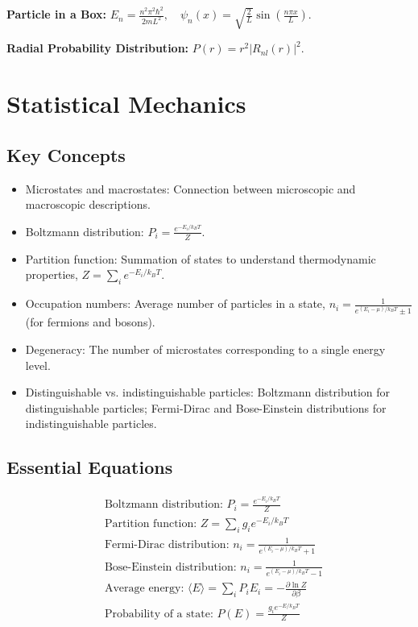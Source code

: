 \documentclass{article}
\newcommand{\eqbox}[1]{\begin{tcolorbox}[colback=gray!10] #1 \end{tcolorbox}}
\newcommand{\conceptbox}[1]{\begin{tcolorbox}[colback=blue!10] #1 \end{tcolorbox}}
\begin{document}
\eqbox{
\textbf{Particle in a Box:} \( E_n = \displaystyle\frac{n^2\pi^2\hbar^2}{2mL^2}, \quad \psi_n(x) = \sqrt{\frac{2}{L}} \sin\left(\frac{n\pi x}{L}\right) \).
}

\eqbox{
\textbf{Radial Probability Distribution:} \( P(r) = r^2|R_{nl}(r)|^2 \).
}

\section{Statistical Mechanics}

\subsection{Key Concepts}
\conceptbox{
\begin{itemize}
    \item Microstates and macrostates: Connection between microscopic and macroscopic descriptions.
    \item Boltzmann distribution: $P_i = \frac{e^{-E_i/k_BT}}{Z}$.
    \item Partition function: Summation of states to understand thermodynamic properties, $Z = \sum_i e^{-E_i/k_BT}$.
    \item Occupation numbers: Average number of particles in a state, $n_i = \frac{1}{e^{(E_i-\mu)/k_BT} \pm 1}$ (for fermions and bosons).
    \item Degeneracy: The number of microstates corresponding to a single energy level.
    \item Distinguishable vs. indistinguishable particles: Boltzmann distribution for distinguishable particles; Fermi-Dirac and Bose-Einstein distributions for indistinguishable particles.
\end{itemize}
}

\subsection{Essential Equations}
\eqbox{
\begin{align*}
    &\text{Boltzmann distribution: } P_i = \frac{e^{-E_i/k_BT}}{Z} \\
    &\text{Partition function: } Z = \sum_i g_i e^{-E_i/k_BT} \\
    &\text{Fermi-Dirac distribution: } n_i = \frac{1}{e^{(E_i-\mu)/k_BT} + 1} \\
    &\text{Bose-Einstein distribution: } n_i = \frac{1}{e^{(E_i-\mu)/k_BT} - 1} \\
    &\text{Average energy: } \langle E \rangle = \sum_i P_i E_i = -\frac{\partial \ln Z}{\partial \beta} \\
    &\text{Probability of a state: } P(E) = \frac{g_i e^{-E/k_BT}}{Z}
\end{align*}
}
\end{document}
